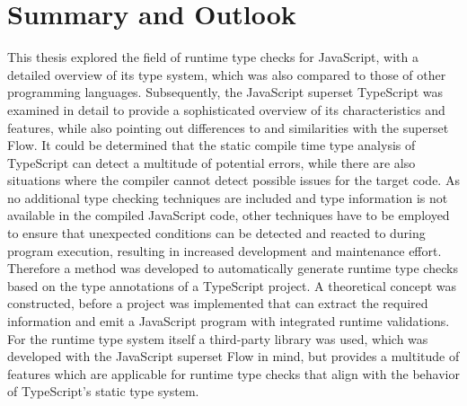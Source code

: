 \chapter{Summary and Outlook}
\label{cha:summary_outlook}

This thesis explored the field of runtime type checks for JavaScript, with a detailed overview of its type system, which was also compared to those of other programming languages. Subsequently, the JavaScript superset TypeScript was examined in detail to provide a sophisticated overview of its characteristics and features, while also pointing out differences to and similarities with the superset Flow. It could be determined that the static compile time type analysis of TypeScript can detect a multitude of potential errors, while there are also situations where the compiler cannot detect possible issues for the target code. As no additional type checking techniques are included and type information is not available in the compiled JavaScript code, other techniques have to be employed to ensure that unexpected conditions can be detected and reacted to during program execution, resulting in increased development and maintenance effort. Therefore a method was developed to automatically generate runtime type checks based on the type annotations of a TypeScript project. A theoretical concept was constructed, before a project was implemented that can extract the required information and emit a JavaScript program with integrated runtime validations. For the runtime type system itself a third-party library was used, which was developed with the JavaScript superset Flow in mind, but provides a multitude of features which are applicable for runtime type checks that align with the behavior of TypeScript's static type system.


